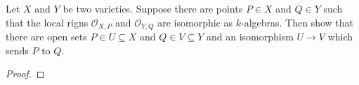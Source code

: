 \label{1.4.7}

Let $X$ and $Y$ be two varieties. Suppose there are points $P \in X$ and $Q \in Y$ such that the local rigns $\mathcal O_{X, P}$ and $\mathcal O_{Y, Q}$ are isomorphic as $k$-algebras. Then show that there are open sets $P \in U \subseteq X$ and $Q \in V \subseteq Y$ and an isomorphism $U \longrightarrow V$ which sends $P$ to $Q$.

\begin{proof}

\end{proof}
